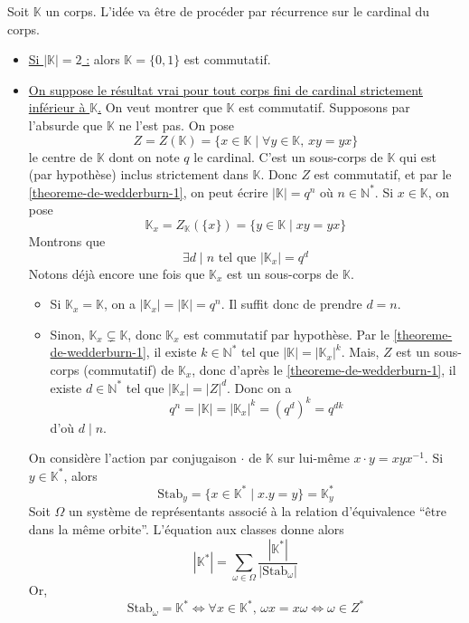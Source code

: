 	\begin{demonstration}
		Soit $\mathbb{K}$ un corps. L'idée va être de procéder par récurrence sur le cardinal du corps.
		\begin{itemize}
			\item \uline{Si $|\mathbb{K}| = 2$ :} alors $\mathbb{K} = \{0, 1\}$ est commutatif.
			\item \uline{On suppose le résultat vrai pour tout corps fini de cardinal strictement inférieur à $\mathbb{K}$.} On veut montrer que $\mathbb{K}$ est commutatif. Supposons par l'absurde que $\mathbb{K}$ ne l'est pas. On pose
			\[ Z = Z(\mathbb{K}) = \{ x \in \mathbb{K} \mid \forall y \in \mathbb{K}, \, xy = yx \} \]
			le centre de $\mathbb{K}$ dont on note $q$ le cardinal. C'est un sous-corps de $\mathbb{K}$ qui est (par hypothèse) inclus strictement dans $\mathbb{K}$. Donc $Z$ est commutatif, et par le \cref{theoreme-de-wedderburn-1}, on peut écrire $|\mathbb{K}| = q^n$ où $n \in \mathbb{N}^*$. Si $x \in \mathbb{K}$, on pose
			\[ \mathbb{K}_x = Z_{\mathbb{K}}(\{ x \}) = \{ y \in \mathbb{K} \mid xy = yx \} \]
			Montrons que
			\[ \exists d \mid n \text{ tel que } |\mathbb{K}_x| = q^d \tag{$*$} \]
			Notons déjà encore une fois que $\mathbb{K}_x$ est un sous-corps de $\mathbb{K}$.
			\begin{itemize}
				\item Si $\mathbb{K}_x = \mathbb{K}$, on a $|\mathbb{K}_x| = |\mathbb{K}| = q^n$. Il suffit donc de prendre $d = n$.
				\item Sinon, $\mathbb{K}_x \subsetneq \mathbb{K}$, donc $\mathbb{K}_x$ est commutatif par hypothèse. Par le \cref{theoreme-de-wedderburn-1}, il existe $k \in \mathbb{N}^*$ tel que $|\mathbb{K}| = |\mathbb{K}_x|^k$.
				\newpar
				Mais, $Z$ est un sous-corps (commutatif) de $\mathbb{K}_x$, donc d'après le \cref{theoreme-de-wedderburn-1}, il existe $d \in \mathbb{N}^*$ tel que $|\mathbb{K}_x| = |Z|^d$. Donc on a
				\[ q^n = |\mathbb{K}| = |\mathbb{K}_x|^k = (q^d)^k = q^{dk} \]
				d'où $d \mid n$.
			\end{itemize}
			On considère l'action par conjugaison $\cdot$ de $\mathbb{K}$ sur lui-même $x \cdot y = xyx^{-1}$. Si $y \in \mathbb{K}^*$, alors
			\[ \mathrm{Stab}_y = \{ x \in \mathbb{K}^* \mid x.y = y \} = \mathbb{K}_y^* \]
			Soit $\Omega$ un système de représentants associé à la relation d'équivalence ``être dans la même orbite''. L'équation aux classes donne alors
			\[ |\mathbb{K}^*| = \sum_{\omega \in \Omega} \frac{|\mathbb{K}^*|}{|\mathrm{Stab}_\omega|} \]
			Or,
			\[ \mathrm{Stab}_\omega = \mathbb{K}^* \iff \forall x \in \mathbb{K}^*, \, \omega x = x \omega \iff \omega \in Z^* \]

\end{itemize}
\end{demonstration}
